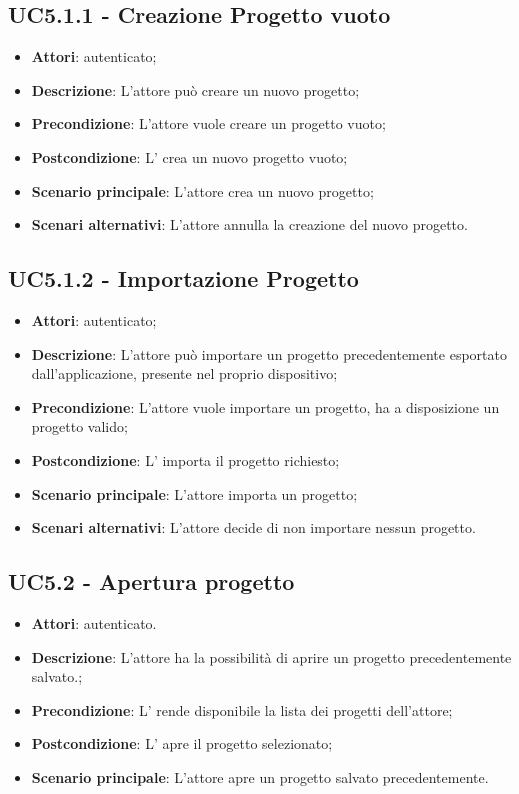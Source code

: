 \subsection{UC5.1.1 - Creazione Progetto vuoto}
\label{ssec:UC5.1.1}
\begin{itemize}
\item \textbf{Attori}:  autenticato;
\item \textbf{Descrizione}: L'attore può creare un nuovo progetto;
\item \textbf{Precondizione}: L'attore vuole creare un progetto vuoto;
\item \textbf{Postcondizione}: L' crea un nuovo progetto vuoto;
\item \textbf{Scenario principale}: L'attore crea un nuovo progetto;
\item \textbf{Scenari alternativi}: L'attore annulla la creazione del nuovo progetto.
\end{itemize}
\newpage
\subsection{UC5.1.2 - Importazione Progetto}
\label{ssec:UC5.1.2}
\begin{itemize}
\item \textbf{Attori}:  autenticato;
\item \textbf{Descrizione}: L'attore può importare un progetto precedentemente esportato dall'applicazione, presente nel proprio dispositivo;
\item \textbf{Precondizione}: L'attore vuole importare un progetto, ha a disposizione un progetto valido;
\item \textbf{Postcondizione}: L' importa il progetto richiesto;
\item \textbf{Scenario principale}: L'attore importa un progetto;
\item \textbf{Scenari alternativi}: L'attore decide di non importare nessun progetto.
\end{itemize}
\subsection{UC5.2 - Apertura progetto}
\label{ssec:UC5.2}
\begin{itemize}
\item \textbf{Attori}:  autenticato.
\item \textbf{Descrizione}: L’attore ha la possibilità di aprire un progetto precedentemente salvato.;
\item \textbf{Precondizione}: L’ rende disponibile la lista dei progetti dell'attore;
\item \textbf{Postcondizione}: L’ apre il progetto selezionato;
\item \textbf{Scenario principale}: L'attore apre un progetto salvato precedentemente.
\end{itemize}
